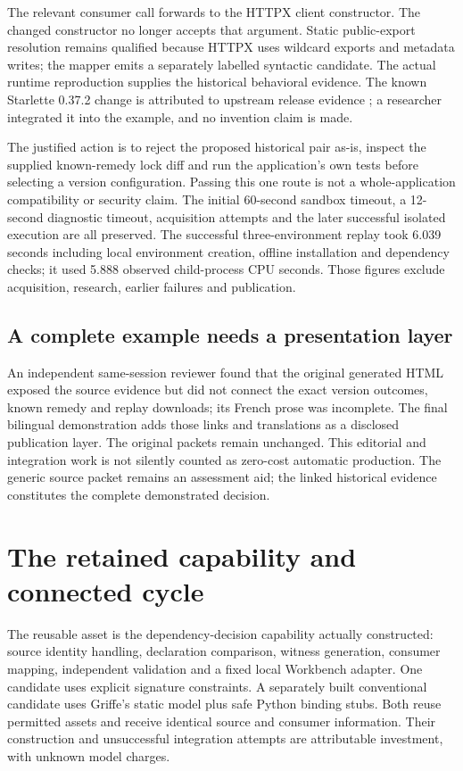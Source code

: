 \documentclass[11pt,letterpaper]{article}
\newcommand{\pathcode}[1]{{\small\ttfamily\detokenize{#1}}}
\begin{document}
The relevant consumer call forwards \pathcode{app=self.app} to the HTTPX client constructor. The changed constructor no longer accepts that argument. Static public-export resolution remains qualified because HTTPX uses wildcard exports and metadata writes; the mapper emits a separately labelled syntactic candidate. The actual runtime reproduction supplies the historical behavioral evidence. The known Starlette 0.37.2 change is attributed to upstream release evidence \cite{starlette-release}; a researcher integrated it into the example, and no invention claim is made.

The justified action is to reject the proposed historical pair as-is, inspect the supplied known-remedy lock diff and run the application's own tests before selecting a version configuration. Passing this one route is not a whole-application compatibility or security claim. The initial 60-second sandbox timeout, a 12-second diagnostic timeout, acquisition attempts and the later successful isolated execution are all preserved. The successful three-environment replay took 6.039 seconds including local environment creation, offline installation and dependency checks; it used 5.888 observed child-process CPU seconds. Those figures exclude acquisition, research, earlier failures and publication.

\subsection{A complete example needs a presentation layer}
An independent same-session reviewer found that the original generated HTML exposed the source evidence but did not connect the exact version outcomes, known remedy and replay downloads; its French prose was incomplete. The final bilingual demonstration adds those links and translations as a disclosed publication layer. The original packets remain unchanged. This editorial and integration work is not silently counted as zero-cost automatic production. The generic source packet remains an assessment aid; the linked historical evidence constitutes the complete demonstrated decision.

\section{The retained capability and connected cycle}
The reusable asset is the dependency-decision capability actually constructed: source identity handling, declaration comparison, witness generation, consumer mapping, independent validation and a fixed local Workbench adapter. One candidate uses explicit signature constraints. A separately built conventional candidate uses Griffe's static model plus safe Python binding stubs. Both reuse permitted assets and receive identical source and consumer information. Their construction and unsuccessful integration attempts are attributable investment, with unknown model charges.
\end{document}
